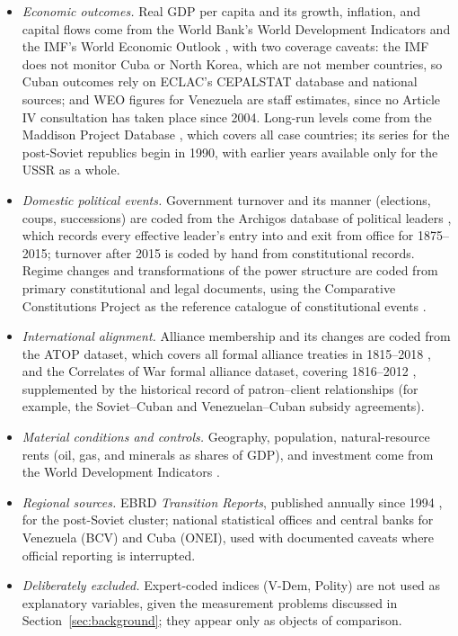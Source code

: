 \documentclass[11pt]{article}
\begin{document}
\begin{itemize}
    \item \emph{Economic outcomes.} Real GDP per capita and its growth, inflation, and capital flows come from the World Bank's World Development Indicators \parencite{worldbank_wdi} and the IMF's World Economic Outlook \parencite{imf_weo}, with two coverage caveats: the IMF does not monitor Cuba or North Korea, which are not member countries, so Cuban outcomes rely on ECLAC's CEPALSTAT database \parencite{eclac_cepalstat} and national sources; and WEO figures for Venezuela are staff estimates, since no Article IV consultation has taken place since 2004. Long-run levels come from the Maddison Project Database \parencite{bolt_vanzanden_2024}, which covers all case countries; its series for the post-Soviet republics begin in 1990, with earlier years available only for the USSR as a whole.
    \item \emph{Domestic political events.} Government turnover and its manner (elections, coups, successions) are coded from the Archigos database of political leaders \parencite{goemans_gleditsch_chiozza_2009}, which records every effective leader's entry into and exit from office for 1875--2015; turnover after 2015 is coded by hand from constitutional records. Regime changes and transformations of the power structure are coded from primary constitutional and legal documents, using the Comparative Constitutions Project as the reference catalogue of constitutional events \parencite{elkins_ginsburg_melton_2009}.
    \item \emph{International alignment.} Alliance membership and its changes are coded from the ATOP dataset, which covers all formal alliance treaties in 1815--2018 \parencite{leeds_etal_2002}, and the Correlates of War formal alliance dataset, covering 1816--2012 \parencite{gibler_sarkees_2004}, supplemented by the historical record of patron--client relationships (for example, the Soviet--Cuban and Venezuelan--Cuban subsidy agreements).
    \item \emph{Material conditions and controls.} Geography, population, natural-resource rents (oil, gas, and minerals as shares of GDP), and investment come from the World Development Indicators \parencite{worldbank_wdi}.
    \item \emph{Regional sources.} EBRD \emph{Transition Reports}, published annually since 1994 \parencite{ebrd_transition}, for the post-Soviet cluster; national statistical offices and central banks for Venezuela (BCV) and Cuba (ONEI), used with documented caveats where official reporting is interrupted.
    \item \emph{Deliberately excluded.} Expert-coded indices (V-Dem, Polity) are not used as explanatory variables, given the measurement problems discussed in Section~\ref{sec:background}; they appear only as objects of comparison.
\end{itemize}
\end{document}
